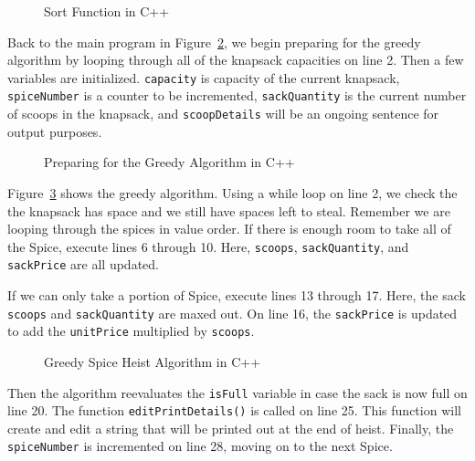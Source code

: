 \documentclass[letterpaper, 10pt,DIV=13]{scrartcl}
\numberwithin{equation}{section} %
\numberwithin{figure}{section} %
\numberwithin{table}{section} %
\begin{document}
\begin{figure}[ht] 
    \centering 
    
    \caption{Sort Function in C++}
    \label{figure:Sort}
\end{figure}

Back to the main program in Figure~\ref{figure:GreedyStart}, we begin preparing for the greedy algorithm by looping through all of the knapsack capacities on line 2. Then a few variables are initialized. \texttt{capacity} is capacity of the current knapsack, \texttt{spiceNumber} is a counter to be incremented, \texttt{sackQuantity} is the current number of scoops in the knapsack, and \texttt{scoopDetails} will be an ongoing sentence for output purposes.


\begin{figure}[ht] 
    \centering 
    
    \caption{Preparing for the Greedy Algorithm in C++}
    \label{figure:GreedyStart}
\end{figure}

\pagebreak

Figure~\ref{figure:GreedyAlgorithm} shows the greedy algorithm. Using a while loop on line 2, we check the the knapsack has space and we still have spaces left to steal. Remember we are looping through the spices in value order. If there is enough room to take all of the Spice, execute lines 6 through 10. Here, \texttt{scoops}, \texttt{sackQuantity}, and \texttt{sackPrice} are all updated. 

If we can only take a portion of Spice, execute lines 13 through 17. Here, the sack \texttt{scoops} and \texttt{sackQuantity} are maxed out. On line 16, the \texttt{sackPrice} is updated to add the \texttt{unitPrice} multiplied by \texttt{scoops}.



\begin{figure}[ht] 
    \centering 
    
    \caption{Greedy Spice Heist Algorithm in C++}
    \label{figure:GreedyAlgorithm}
\end{figure}


Then the algorithm reevaluates the \texttt{isFull} variable in case the sack is now full on line 20. The function \texttt{editPrintDetails()} is called on line 25. This function will create and edit a string that will be printed out at the end of heist. Finally, the \texttt{spiceNumber} is incremented on line 28, moving on to the next Spice.
\end{document}
